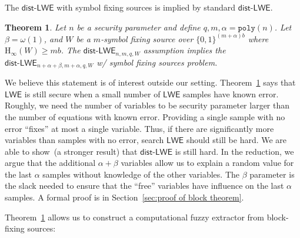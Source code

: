 \documentclass[11pt]{article}
\newcommand{\secref}[1]{\mbox{Section~\ref{#1}}}
\newcommand{\thref}[1]{\mbox{Theorem~\ref{#1}}}
\newcommand{\class}[1]{{\ensuremath{\mathsf{#1}}}}
\newcommand{\zo}{\ensuremath{\{0, 1\}}}
\newcommand{\poly}{\ensuremath{\mathtt{poly}}\xspace}
\newcommand{\Hoo}{\mathrm{H}_\infty}
\newcommand{\LWE}{\class{LWE}}
\newcommand{\distLWE}{\ensuremath{\class{dist\mbox{-}LWE}}}
\newtheorem{theorem}{Theorem}[section]
\newcommand{\authnote}[2]{{\textcolor{red}{\textsf{#1 notes: }\textcolor{blue}{ #2}}\marginpar{\textcolor{red}{\textbf{!!!!!}}}}}
\newcommand{\authnote}[2]{}
\newcommand{\lnote}[1]{{\authnote{Leo}{#1}}}
\begin{document}
The $\distLWE$ with symbol fixing sources is implied by standard $\distLWE$.
\begin{theorem}
\label{thm:blockLWE}
Let $n$ be a security parameter and define $q, m , \alpha = \poly(n)$.  Let $\beta  = \omega(1)$, and $W$ be a $m$-symbol fixing source over $\{0,1\}^{(m+\alpha)b}$ where $\Hoo(W) \geq mb$.  The $\distLWE_{n, m,q, W}$ assumption implies the $\distLWE_{n+\alpha+\beta, m+\alpha, q, W}$ w/ symbol fixing sources problem.
\end{theorem}
We believe this statement is of interest outside our setting.  \thref{thm:blockLWE} says that $\LWE$ is still secure when a small number of $\LWE$ samples have known error.  Roughly, we need the number of variables to be security parameter larger than the number of equations with known error.  Providing a single sample with no error ``fixes'' at most a single variable.  Thus, if there are significantly more variables than samples with no error, search $\LWE$ should still be hard.  We are able to show~(a stronger result) that $\distLWE$ is still hard.  In the reduction, we argue that the additional $\alpha+ \beta$ variables allow us to explain a random value for the last $\alpha$ samples without knowledge of the other variables.  The $\beta$ parameter is the slack needed to ensure that the ``free'' variables have influence on the last $\alpha$ samples.  A formal proof is in \secref{sec:proof of block theorem}.


\thref{thm:blockLWE} allows us to construct a computational fuzzy extractor from block-fixing sources: 

\end{document}
